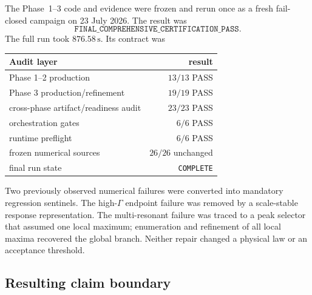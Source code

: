 \documentclass[11pt]{article}
\theoremstyle{definition}
\theoremstyle{remark}
\begin{document}
The Phase~1--3 code and evidence were frozen and rerun once as a fresh fail-closed campaign on 23 July 2026.  The result was
\begin{equation}
 \boxed{\texttt{FINAL\_COMPREHENSIVE\_CERTIFICATION\_PASS}.}
 \label{eq:final-certification-pass}
\end{equation}
The full run took $876.58\,\mathrm{s}$.  Its contract was
\begin{center}
\begin{tabular}{lr}
\toprule
Audit layer & result\\
\midrule
Phase 1--2 production & $13/13$ PASS\\
Phase 3 production/refinement & $19/19$ PASS\\
cross-phase artifact/readiness audit & $23/23$ PASS\\
orchestration gates & $6/6$ PASS\\
runtime preflight & $6/6$ PASS\\
frozen numerical sources & $26/26$ unchanged\\
final run state & \texttt{COMPLETE}\\
\bottomrule
\end{tabular}
\end{center}
Two previously observed numerical failures were converted into mandatory regression sentinels.  The high-$\Gamma$ endpoint failure was removed by a scale-stable response representation.  The multi-resonant failure was traced to a peak selector that assumed one local maximum; enumeration and refinement of all local maxima recovered the global branch.  Neither repair changed a physical law or an acceptance threshold.

\subsection{Resulting claim boundary}
\end{document}
